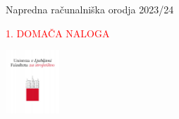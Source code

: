\begin{frame}{Napredna računalniška orodja 2023/24}

     \begin{center}

  \textcolor{red}{\LARGE 1. DOMAČA NALOGA}
     
    
    
    \includegraphics[width=2cm]{faks.png}
  \end{center}
    
\end{frame}